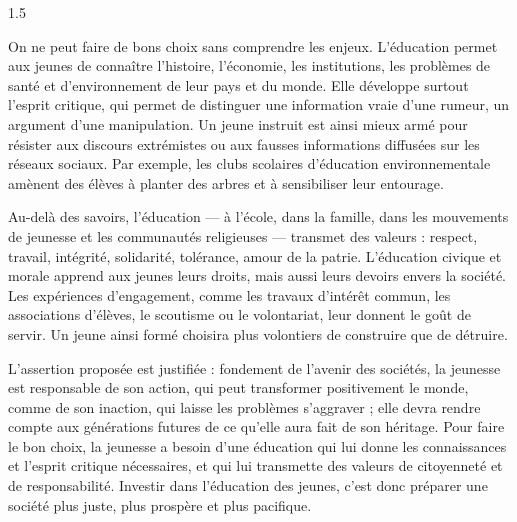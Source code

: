 \documentclass[12pt]{article}
\begin{document}
\begin{spacing}{1.5}


On ne peut faire de bons choix sans comprendre les enjeux. L'éducation permet aux jeunes de connaître l'histoire, l'économie, les institutions, les problèmes de santé et d'environnement de leur pays et du monde. Elle développe surtout l'esprit critique, qui permet de distinguer une information vraie d'une rumeur, un argument d'une manipulation. Un jeune instruit est ainsi mieux armé pour résister aux discours extrémistes ou aux fausses informations diffusées sur les réseaux sociaux. Par exemple, les clubs scolaires d'éducation environnementale amènent des élèves à planter des arbres et à sensibiliser leur entourage.

Au-delà des savoirs, l'éducation — à l'école, dans la famille, dans les mouvements de jeunesse et les communautés religieuses — transmet des valeurs : respect, travail, intégrité, solidarité, tolérance, amour de la patrie. L'éducation civique et morale apprend aux jeunes leurs droits, mais aussi leurs devoirs envers la société. Les expériences d'engagement, comme les travaux d'intérêt commun, les associations d'élèves, le scoutisme ou le volontariat, leur donnent le goût de servir. Un jeune ainsi formé choisira plus volontiers de construire que de détruire.


L'assertion proposée est justifiée : fondement de l'avenir des sociétés, la jeunesse est responsable de son action, qui peut transformer positivement le monde, comme de son inaction, qui laisse les problèmes s'aggraver ; elle devra rendre compte aux générations futures de ce qu'elle aura fait de son héritage. Pour faire le bon choix, la jeunesse a besoin d'une éducation qui lui donne les connaissances et l'esprit critique nécessaires, et qui lui transmette des valeurs de citoyenneté et de responsabilité. Investir dans l'éducation des jeunes, c'est donc préparer une société plus juste, plus prospère et plus pacifique.

\end{spacing}
\end{document}
